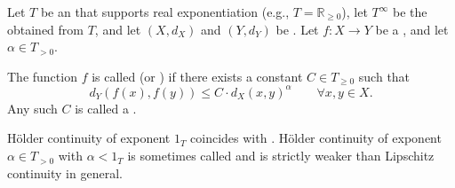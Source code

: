 \begin{definition} \label{definition:holder_continuous_function_between_metric_spaces}
    Let $T$ be an  that supports real exponentiation (e.g., $T = \mathbb{R}_{\ge 0}$), let $T^\infty$ be the  obtained from $T$, and let $(X, d_X)$ and $(Y, d_Y)$ be . Let $f : X \to Y$ be a , and let $\alpha \in T_{>0}$.

    The function $f$ is called  (or ) if there exists a constant $C \in T_{\ge 0}$ such that
    $$d_Y(f(x), f(y)) \le C \cdot d_X(x, y)^\alpha \qquad \forall x, y \in X.$$
    Any such $C$ is called a .

    Hölder continuity of exponent $1_T$ coincides with . Hölder continuity of exponent $\alpha \in T_{>0}$ with $\alpha < 1_T$ is sometimes called  and is strictly weaker than Lipschitz continuity in general.
\end{definition}